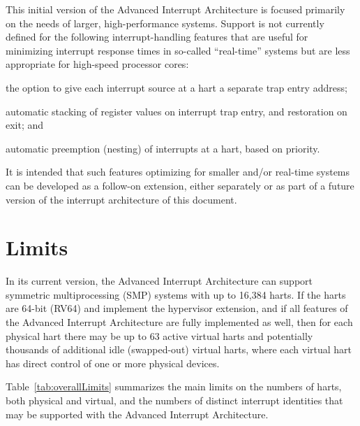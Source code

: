 This initial version of the Advanced Interrupt Architecture is focused
primarily on the needs of larger, high-performance {\RISCV} systems.
Support is not currently defined for the following interrupt-handling
features that are useful for minimizing interrupt response times in
so-called ``real-time'' systems but are less appropriate for high-speed
processor cores:
\begin{tightList}
\item
the option to give each interrupt source at a hart a separate trap
entry address;
\item
automatic stacking of register values on interrupt trap entry, and
restoration on exit; and
\item
automatic preemption (nesting) of interrupts at a hart, based on
priority.
\end{tightList}
It is intended that such features optimizing for smaller and/or
real-time systems can be developed as a follow-on extension, either
separately or as part of a future version of the interrupt architecture
of this document.

\section{Limits}

In its current version, the {\RISCV} Advanced Interrupt Architecture
can support {\RISCV} symmetric multiprocessing (SMP) systems with up to
16,384 harts.
If the harts are \mbox{64-bit} (RV64) and implement the hypervisor
extension, and if all features of the Advanced Interrupt Architecture
are fully implemented as well, then for each physical hart there may be
up to 63 active virtual harts and potentially thousands of additional
idle (swapped-out) virtual harts, where each virtual hart has direct
control of one or more physical devices.

Table~\ref{tab:overallLimits} summarizes the main limits on the numbers
of harts, both physical and virtual, and the numbers of distinct
interrupt identities that may be supported with the Advanced Interrupt
Architecture.

